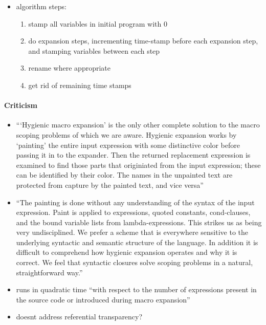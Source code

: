 \documentclass[12pt]{article}	%
\begin{document}
\begin{itemize}
	\item algorithm steps:
		\begin{enumerate}
				\item stamp all variables in initial program with 0
				\item do expansion steps, incrementing time-stamp before each expansion step, and stamping variables between each step
				\item rename where appropriate
				\item get rid of remaining time stamps
			\end{enumerate}
	
\end{itemize}

\paragraph{Criticism}

\begin{itemize}
	\item ```Hygienic macro expansion' is the only other complete solution to the macro scoping problems of which we are aware. Hygienic expansion works by `painting' the entire input expression with some distinctive color before passing it in to the expander. Then the returned replacement expression is examined to find those parts that originiated from the input expression; these can be identified by their color. The names in the unpainted text are protected from capture by the painted text, and vice versa''~\cite[p90]{Bawden1988Syntactic}
	\item ``The painting is done without any understanding of the syntax of the input expression. Paint is applied to expressions, quoted constants, cond-clauses, and the bound variable lists from lambda-expressions. This strikes us as being very undisciplined. We prefer a scheme that is everywhere sensitive to the underlying syntactic and semantic structure of the language. In addition it is difficult to comprehend how hygienic expansion operates and why it is correct. We feel that syntactic closures solve scoping problems in a natural, straightforward way.''~\cite[p90]{Bawden1988Syntactic}
	\item runs in quadratic time ``with respect to the number of expressions present in the source code or introduced during macro expansion''~\cite[p298]{Dybvig1992Syntactic}
	\item doesnt address referential transparency?~\cite[p299]{Dybvig1992Syntactic}
\end{itemize}
\end{document}
